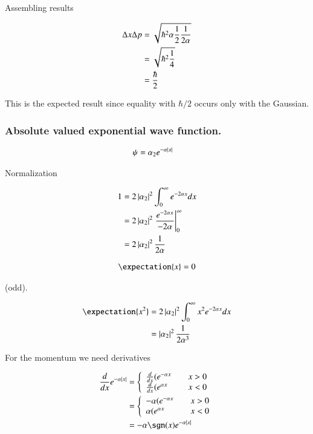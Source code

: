 Assembling results

\begin{align*}
\Delta x \Delta p 
&= \sqrt{\hbar^2 \alpha \frac{1}{2} \frac{1}{2\alpha}} \\
&= \sqrt{\hbar^2 \frac{1}{4}} \\
&= \frac{\hbar}{2}
\end{align*}

This is the expected result since equality with $\hbar/2$ occurs only with the Gaussian.

\subsubsection{Absolute valued exponential wave function. }

\begin{align*}
\psi &= \alpha_2 e^{-\alpha\left\lvert{x}\right\rvert}
\end{align*}

Normalization

\begin{align*}
1 
&= 2 \left\lvert{\alpha_2}\right\rvert^2 \int_0^\infty e^{-2 \alpha{x}} dx \\
&= 2 \left\lvert{\alpha_2}\right\rvert^2 \left. \frac{e^{-2 \alpha{x}}}{-2\alpha} \right\vert_0^\infty \\
&= 2 \left\lvert{\alpha_2}\right\rvert^2 \frac{1}{2\alpha}
\end{align*}

\begin{align*}
\expectation{x} = 0
\end{align*}

(odd).

\begin{align*}
\expectation{x^2} 
&= 2 \Abs{\alpha_2}^2 \int_0^\infty x^2 e^{-2\alpha x} dx \\
&= \Abs{\alpha_2}^2 \inv{2 \alpha^3}
\end{align*}

For the momentum we need derivatives

\begin{align*}
\frac{d}{dx} e^{-\alpha \Abs{x}} 
&=
\left\{
\begin{array}{l l}
\frac{d}{dx}(e^{-\alpha x} & \quad \mbox{$x>0$} \\
\frac{d}{dx}(e^{\alpha x} & \quad \mbox{$x<0$} \\
\end{array}
\right. \\
&=
\left\{
\begin{array}{l l}
-\alpha (e^{-\alpha x} & \quad \mbox{$x>0$} \\
\alpha (e^{\alpha x} & \quad \mbox{$x<0$} \\
\end{array}
\right. \\
&=
-\alpha \sgn(x) e^{-\alpha \Abs{x}}
\end{align*}

